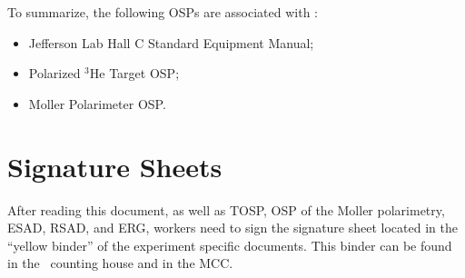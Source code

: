 To summarize, the following OSPs are associated with \EXPTS:
\begin{itemize}
 \item Jefferson Lab Hall C Standard Equipment Manual;
 \item Polarized $^3$He Target OSP;
 \item Moller Polarimeter OSP.
\end{itemize}

\newpage
\section{Signature Sheets}

After reading this document, as well as TOSP, OSP of the Moller polarimetry,
ESAD, RSAD, and ERG, workers need to sign
the signature sheet located in the ``yellow binder'' of the experiment specific documents.
This binder can be found in the \HALL\ counting house and in the MCC.
